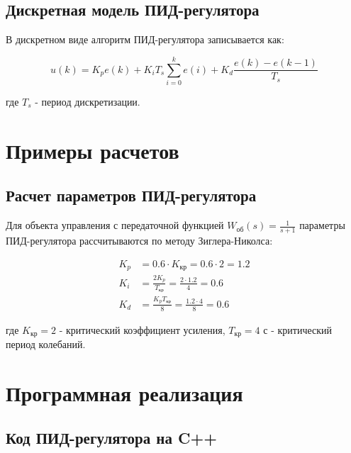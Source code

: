 \subsection{Дискретная модель ПИД-регулятора}

В дискретном виде алгоритм ПИД-регулятора записывается как:

\begin{equation}
u(k) = K_p e(k) + K_i T_s \sum_{i=0}^{k} e(i) + K_d \frac{e(k) - e(k-1)}{T_s}
\end{equation}

где $T_s$ - период дискретизации.

\section{Примеры расчетов}

\subsection{Расчет параметров ПИД-регулятора}

Для объекта управления с передаточной функцией $W_{об}(s) = \frac{1}{s+1}$ параметры ПИД-регулятора рассчитываются по методу Зиглера-Николса:

\begin{align}
K_p &= 0.6 \cdot K_{кр} = 0.6 \cdot 2 = 1.2 \\
K_i &= \frac{2K_p}{T_{кр}} = \frac{2 \cdot 1.2}{4} = 0.6 \\
K_d &= \frac{K_p T_{кр}}{8} = \frac{1.2 \cdot 4}{8} = 0.6
\end{align}

где $K_{кр} = 2$ - критический коэффициент усиления, $T_{кр} = 4$ с - критический период колебаний.

\section{Программная реализация}

\subsection{Код ПИД-регулятора на C++}

